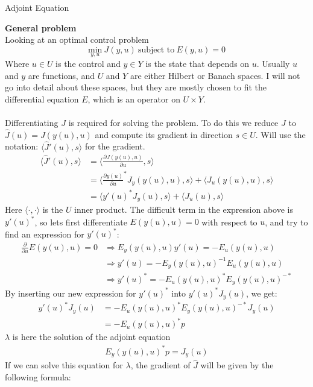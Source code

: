 \documentclass[11pt,a4paper]{report}
\begin{document}
\begin{center}

\LARGE Adjoint Equation


\end{center}
\textbf{General problem}
\\
Looking at an optimal control problem $$\underset{y,u}{\text{min}} \ J(y,u) \ \text{subject to} \ E(y,u)=0$$ Where $u \in U$ is the control and $y \in Y$ is the state that depends on $u$. Usually $u$ and $y$ are functions, and $U$ and $Y$ are either Hilbert or Banach spaces. I will not go into detail about these spaces, but they are mostly chosen to fit the differential equation $E$, which is an operator on $U\times Y$.
\\
\\
Differentiating $J$ is required for solving the problem. To do this we reduce $J$ to $\hat{J}(u) = J(y(u),u) $ and compute its gradient in direction $s \in U$. Will use the notation: $\langle\hat{J}'(u),s\rangle$ for the gradient.
\begin{align*}    
\langle\hat{J}'(u),s\rangle &= \langle\frac{\partial J(y(u),u)}{\partial u},s\rangle \\ &= \langle \frac{\partial y(u)}{\partial u}^*J_y(y(u),u),s\rangle + \langle J_u(y(u),u),s\rangle \\ &= \langle y'(u)^*J_y(u),s\rangle +\langle J_u(u),s\rangle
\end{align*}
Here $\langle\cdot,\cdot\rangle$ is the $U$ inner product. The difficult term in the expression above is $y'(u)^*$, so lets first differentiate $E(y(u),u)=0$ with respect to $u$, and try to find an expression for $y'(u)^*$: 
\begin{align*}
\frac{\partial}{\partial u}E(y(u),u)=0 &\Rightarrow E_y(y(u),u)y'(u)=-E_u(y(u),u) \\ &\Rightarrow y'(u)=-E_y(y(u),u)^{-1}E_u(y(u),u) \\ &\Rightarrow y'(u)^* = -E_u(y(u),u)^*E_y(y(u),u)^{-*}
\end{align*} 
By inserting our new expression for $y'(u)^*$ into $y'(u)^*J_y(u)$, we get:
\begin{align*}
y'(u)^*J_y(u)&=-E_u(y(u),u)^*E_y(y(u),u)^{-*}J_y(u) \\
&=-E_u(y(u),u)^*p
\end{align*}
$\lambda$ is here the solution of the adjoint equation 
\begin{gather*}
E_y(y(u),u)^{*}p=J_y(u)
\end{gather*}
If we can solve this equation for $\lambda$, the gradient of $\hat{J}$ will be given by the following formula:  
\end{document}
